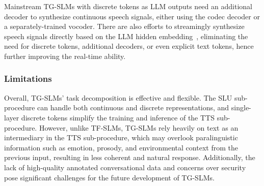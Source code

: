 Mainstream TG-SLMs with discrete tokens as LLM outputs need an additional decoder to synthesize continuous speech signals, either using the codec decoder or a separately-trained vocoder.
There are also efforts to streamingly synthesize speech signals directly based on the LLM hidden embedding~\cite{yu2024salmonnomni,chen2025minmo}, eliminating the need for discrete tokens, additional decoders, or even explicit text tokens, hence further improving the real-time ability.

\subsubsection{Limitations}
Overall, TG-SLMs' task decomposition is effective and flexible.
The SLU sub-procedure can handle both continuous and discrete representations, and single-layer discrete tokens simplify the training and inference of the TTS sub-procedure.
However, unlike TF-SLMs, TG-SLMs rely heavily on text as an intermediary in the TTS sub-procedure, which may overlook paralinguistic information such as emotion, prosody, and environmental context from the previous input, resulting in less coherent and natural response. Additionally, the lack of high-quality annotated conversational data and concerns over security pose significant challenges for the future development of TG-SLMs.
